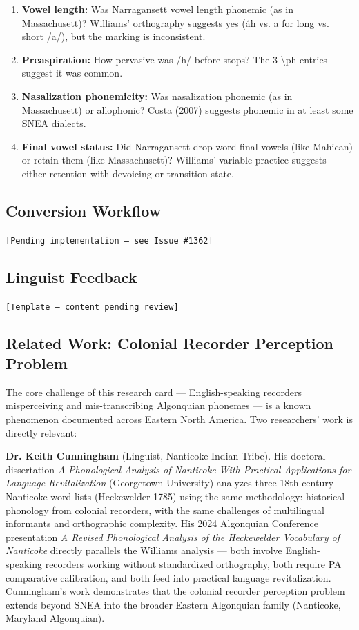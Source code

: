 \begin{enumerate}
  \item \textbf{Vowel length:} Was Narragansett vowel length phonemic (as in
    Massachusett)? Williams' orthography suggests yes (áh vs. a for long vs.
    short /a/), but the marking is inconsistent.
  \item \textbf{Preaspiration:} How pervasive was /h/ before stops? The 3
    \textbackslash ph entries suggest it was common.
  \item \textbf{Nasalization phonemicity:} Was nasalization phonemic (as in
    Massachusett) or allophonic? Costa (2007) suggests phonemic in at least
    some SNEA dialects.
  \item \textbf{Final vowel status:} Did Narragansett drop word-final vowels
    (like Mahican) or retain them (like Massachusett)? Williams' variable
    practice suggests either retention with devoicing or transition state.
\end{enumerate}

\subsection{Conversion Workflow}
\texttt{[Pending implementation --- see Issue \#1362]}

\subsection{Linguist Feedback}
\texttt{[Template --- content pending review]}

\subsection{Related Work: Colonial Recorder Perception Problem}

The core challenge of this research card --- English-speaking recorders
misperceiving and mis-transcribing Algonquian phonemes --- is a known
phenomenon documented across Eastern North America. Two researchers' work is
directly relevant:

\textbf{Dr. Keith Cunningham} (Linguist, Nanticoke Indian Tribe). His doctoral
dissertation \emph{A Phonological Analysis of Nanticoke With Practical
Applications for Language Revitalization} (Georgetown University) analyzes
three 18th-century Nanticoke word lists (Heckewelder 1785) using the same
methodology: historical phonology from colonial recorders, with the same
challenges of multilingual informants and orthographic complexity. His 2024
Algonquian Conference presentation \emph{A Revised Phonological Analysis of
the Heckewelder Vocabulary of Nanticoke} directly parallels the Williams
analysis --- both involve English-speaking recorders working without
standardized orthography, both require PA comparative calibration, and both
feed into practical language revitalization. Cunningham's work demonstrates
that the colonial recorder perception problem extends beyond SNEA into the
broader Eastern Algonquian family (Nanticoke, Maryland Algonquian).


